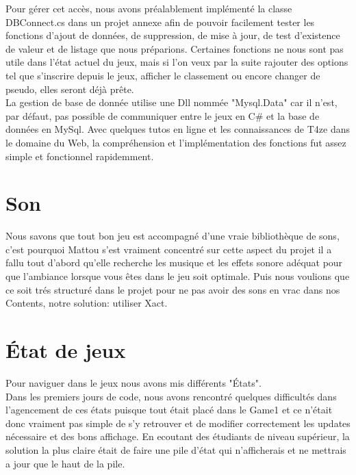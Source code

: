 \documentclass [11pt]{report}
\begin{document}
	Pour gérer cet accès, nous avons préalablement implémenté la classe DBConnect.cs dans un projet annexe afin de pouvoir facilement tester les fonctions d'ajout de données, de suppression, de mise à jour, de test d'existence de valeur et de listage que nous préparions. Certaines fonctions ne nous sont pas utile dans l'état actuel du jeux, mais si l'on veux par la suite rajouter des options tel que s'inscrire depuis le jeux, afficher le classement ou encore changer de pseudo, elles seront déjà prête.\\
	
	La gestion de base de donnée utilise une Dll nommée "Mysql.Data" car il n'est, par défaut, pas possible de communiquer entre le jeux en C\# et la base de données en MySql. 
	Avec quelques tutos en ligne et les connaissances de T4ze dans le domaine du Web, la compréhension et l'implémentation des fonctions fut assez simple et fonctionnel rapidemment.
	
	
	\vspace{10mm}


	\section{Son}
	Nous savons que tout bon jeu est accompagné d'une vraie bibliothèque de sons, c'est pourquoi Mattou s'est vraiment concentré sur cette aspect du projet il a fallu tout d'abord qu'elle recherche les musique et les effets sonore adéquat pour que l'ambiance lorsque vous êtes dans le jeu soit optimale. Puis nous voulions que ce soit trés structuré dans le projet pour ne pas avoir des sons en vrac dans nos Contents, notre solution: utiliser Xact. 
	
	
	\vspace{10mm}
	
	
	\section{\'Etat de jeux}
	Pour naviguer dans le jeux nous avons mis différents "États". \\
	
	Dans les premiers jours de code, nous avons rencontré quelques difficultés dans l'agencement de ces états puisque tout était placé dans le Game1 et ce n'était donc vraiment pas simple de s'y retrouver et de modifier correctement les updates nécessaire et des bons affichage. En ecoutant des étudiants de niveau supérieur, la solution la plus claire était de faire une pile d'état qui n'afficherais et ne mettrais a jour que le haut de la pile.
	
\end{document}
